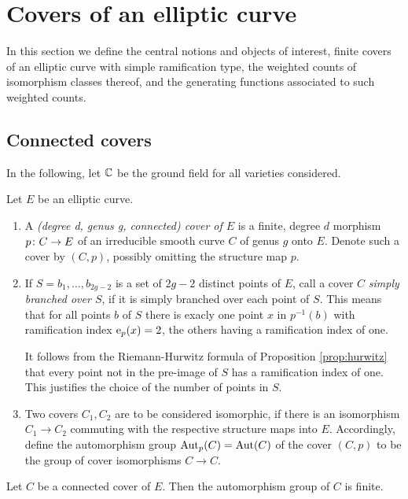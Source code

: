 \section{Covers of an elliptic curve} \label{sec:covers-definitions}

In this section we define the central notions and objects of interest, \ie finite covers of an elliptic curve with simple ramification type, the weighted counts of isomorphism classes thereof, and the generating functions associated to such weighted counts.

\subsection{Connected covers}

In the following, let $\mathbb{C}$ be the ground field for all varieties considered.

\begin{defi} Let $E$ be an elliptic curve. 
 \begin{enumerate}
  \item A \emph{(degree d, genus g, connected) cover of $E$} is a finite, degree $d$ morphism $p\colon C\to E$ of an irreducible smooth curve $C$ of genus $g$ onto $E$. Denote such a cover by $(C,p)$, possibly omitting the structure map $p$.

  \item If $S={b_1,\dotsc,b_{2g-2}}$ is a set of $2g-2$ distinct points of $E$, call a cover $C$ \emph{simply branched over $S$}, if it is simply branched over each point of $S$. This means that for all points $b$ of $S$ there is exacly one point $x$ in $p^{-1}(b)$ with ramification index $\operatorname{e}_p(x)=2$, the others having a ramification index of one.
  
  It follows from the Riemann-Hurwitz formula of Proposition \ref{prop:hurwitz} that every point not in the pre-image of $S$ has a ramification index of one. This justifies the choice of the number of points in $S$.

  \item Two covers $C_1, C_2$ are to be considered isomorphic, if there is an isomorphism $C_1\to C_2$ commuting with the respective structure maps into $E$. Accordingly, define the automorphism group $\operatorname{Aut}_p(C)=\operatorname{Aut}(C)$ of the cover $(C,p)$ to be the group of cover isomorphisms $C\to C$. 
 \end{enumerate}
\end{defi}

\begin{prop}
 Let $C$ be a connected cover of $E$. Then the automorphism group of $C$ is finite.
\end{prop}


